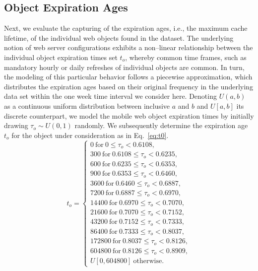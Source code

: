 \subsection{Object Expiration Ages}
Next, we evaluate the capturing of the expiration ages, i.e., the maximum cache lifetime, of the individual web objects found in the dataset.
The underlying notion of web server configurations exhibits a non--linear relationship between the individual object expiration times set $t_o$, whereby common time frames, such as mandatory hourly or daily refreshes of individual objects are common. 
In turn, the modeling of this particular behavior follows a piecewise approximation, which distributes the expiration ages based on their original frequency in the underlying data set within the one week time interval we consider here.
Denoting $U(a,b)$ as a continuous uniform distribution between inclusive $a$ and $b$ and $U[a,b]$ its discrete counterpart, we model the mobile web object expiration times by initially drawing $\tau_o \sim U(0,1)$ randomly.
We subsequently determine the expiration age $t_o$ for the object under consideration as in Eq.~\ref{eq:t0}.
\begin{equation*}\label{eq:t0}
t_o =
\begin{cases}
0 ~\mathrm{for}~ 0 \le \tau_o <  0.6108,\\
300 ~\mathrm{for}~ 0.6108 \le  \tau_o < 0.6235,\\
600 ~\mathrm{for}~ 0.6235 \le \tau_o < 0.6353,\\
900 ~\mathrm{for}~ 0.6353 \le \tau_o < 0.6460,\\
3600 ~\mathrm{for}~0.6460 \le \tau_o < 0.6887,\\
7200 ~\mathrm{for}~0.6887 \le \tau_o < 0.6970,\\
14400 ~\mathrm{for}~0.6970 \le \tau_o < 0.7070,\\
21600 ~\mathrm{for}~0.7070 \le \tau_o < 0.7152,\\
43200 ~\mathrm{for}~0.7152 \le \tau_o < 0.7333,\\
86400 ~\mathrm{for}~0.7333 \le \tau_o < 0.8037,\\
172800 ~\mathrm{for}~0.8037 \le \tau_o < 0.8126,\\
604800 ~\mathrm{for}~0.8126 \le \tau_o < 0.8909,\\
U[0, 604800]~\mathrm{otherwise}.
\end{cases}
\end{equation*}

